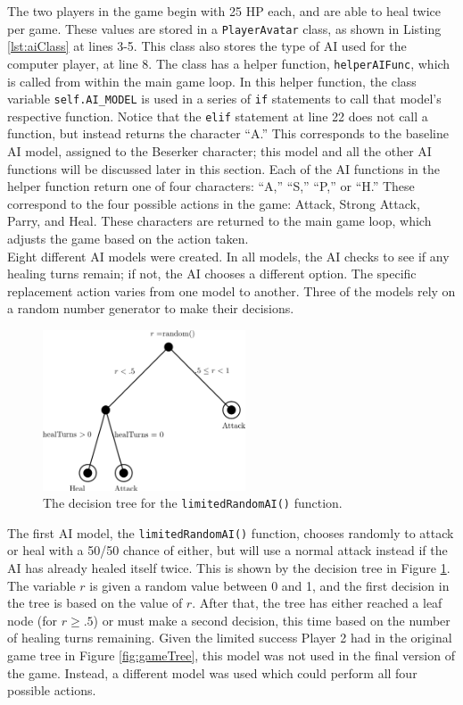 The two players in the game begin with 25 HP each, and are able to heal twice per game. These values are stored in a \texttt{PlayerAvatar} class, as shown in Listing \ref{lst:aiClass} at lines 3-5. This class also stores the type of AI used for the computer player, at line 8. The class has a helper function, \texttt{helperAIFunc}, which is called from within the main game loop. In this helper function, the class variable \texttt{self.AI\_MODEL} is used in a series of \texttt{if} statements to call that model's respective function. Notice that the \texttt{elif} statement at line 22 does not call a function, but instead returns the character ``A.'' This corresponds to the baseline AI model, assigned to the Beserker character; this model and all the other AI functions will be discussed later in this section. Each of the AI functions in the helper function return one of four characters: ``A,'' ``S,'' ``P,'' or ``H.'' These correspond to the four possible actions in the game: Attack, Strong Attack, Parry, and Heal. These characters are returned to the main game loop, which adjusts the game based on the action taken.\\

Eight different AI models were created. In all models, the AI checks to see if any healing turns remain; if not, the AI chooses a different option. The specific replacement action varies from one model to another. Three of the models rely on a random number generator to make their decisions.\\

\begin{figure}[H]
  \centering
  \includegraphics[width=6cm]{figures/AILimitedRandom.png}
  \caption{The decision tree for the \texttt{limitedRandomAI()} function.}
  \label{fig:AI1}
\end{figure}

The first AI model, the \texttt{limitedRandomAI()} function, chooses randomly to attack or heal with a 50/50 chance of either, but will use a normal attack instead if the AI has already healed itself twice. This is shown by the decision tree in Figure \ref{fig:AI1}. The variable $r$ is given a random value between 0 and 1, and the first decision in the tree is based on the value of $r$. After that, the tree has either reached a leaf node (for $r\ge .5$) or must make a second decision, this time based on the number of healing turns remaining. Given the limited success Player 2 had in the original game tree in Figure \ref{fig:gameTree}, this model was not used in the final version of the game. Instead, a different model was used which could perform all four possible actions.\\

